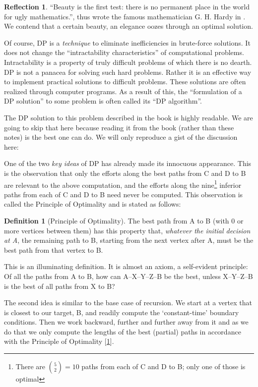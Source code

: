 \documentclass[english,notitlepage,smartquotes]{hgbreport}
\theoremstyle{definition}
\newtheorem{definition}{Definition}
\theoremstyle{definition}
\theoremstyle{remark}
\theoremstyle{definition}
\theoremstyle{plain}
\theoremstyle{definition}
\newtheorem{reflection}{Reflection}
\begin{document}
\begin{reflection}
``Beauty is the first test: there is no permanent place in the world for ugly mathematics.'', thus wrote the famous mathematician G. H. Hardy in \cite{Hardy1940}. We contend that a certain beauty, an elegance oozes through an optimal solution. 

Of course, DP is a \emph{technique} to eliminate inefficiencies in brute-force solutions. It does not change the ``intractability characteristics'' of computational problems. Intractability is a property of truly difficult problems of which there is no dearth. DP is not a panacea for solving such hard problems. Rather it is an effective way to implement practical solutions to difficult problems. These solutions are often realized through computer programs. As a result of this, the ``formulation of a DP solution'' to some problem is often called its ``DP algorithm''.

The DP solution to this problem described in the book is highly readable. We are going to skip that here because reading it from the book (rather than these notes) is the best one can do. We will only reproduce a gist of the discussion here:
\begin{sidebar}
One of the two \emph{key ideas} of DP has already made its innocuous appearance. This is the observation that only the efforts along the best paths from C and D to B are relevant to the above computation, and the efforts along the nine\footnote{There are ${5\choose 2}=10$ paths from each of C and D to B; only one of those is optimal} inferior paths from each of C and D to B need never be computed. This observation is called the Principle of Optimality and is stated as follows:
\begin{definition}[Principle of Optimality]
\label{def:poopt}
The best path from A to B (with 0 or more vertices between them) has this property that, \emph{whatever the initial decision at A}, the remaining path to B, starting from the next vertex after A, must be the best path from that vertex to B.
\end{definition}

This is an illuminating definition. It is almost an axiom, a self-evident principle: Of all the paths from A to B, how can A--X--Y--Z--B be the best, unless X--Y--Z--B is the best of all paths from X to B?

The second idea is similar to the base case of recursion. We start at a vertex that is closest to our target, B, and readily compute the `constant-time' boundary conditions. Then we work backward, further and further away from it and as we do that we only compute the lengths of the best (partial) paths in accordance with the Principle of Optimality [\ref{def:poopt}]. 


\end{sidebar}
\end{reflection}
\end{document}
